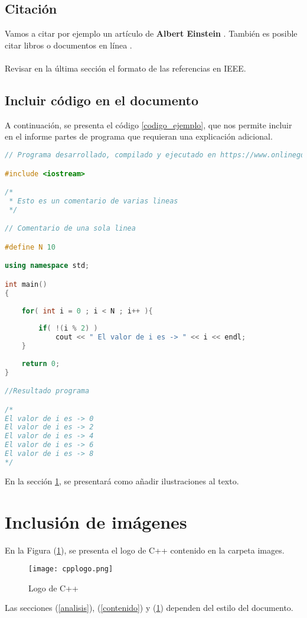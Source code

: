 \documentclass{article}
\begin{document}
\subsection{Citación}
Vamos a citar por ejemplo un artículo de \textbf{Albert Einstein} \cite{einstein}.
También es posible citar libros \cite{dirac} o documentos en línea \cite{knuthwebsite}.\\\\
Revisar en la última sección el formato de las referencias en IEEE.

\subsection{Incluir código en el documento}
%
A continuación, se presenta el código \ref{codigo_ejemplo}, que nos permite incluir en el informe partes de programa que requieran una explicación adicional.
\begin{lstlisting}[language=C++, label=codigo_ejemplo]
// Programa desarrollado, compilado y ejecutado en https://www.onlinegdb.com

#include <iostream>

/*
 * Esto es un comentario de varias lineas
 */

// Comentario de una sola linea

#define N 10

using namespace std;

int main()
{
    
    for( int i = 0 ; i < N ; i++ ){
        
        if( !(i % 2) )
            cout << " El valor de i es -> " << i << endl;
    }
    
    return 0;
}

//Resultado programa

/*
El valor de i es -> 0
El valor de i es -> 2
El valor de i es -> 4
El valor de i es -> 6
El valor de i es -> 8
*/
\end{lstlisting}
En la sección \ref{imagenes}, se presentará como añadir ilustraciones al texto.

\section{Inclusión de imágenes} \label{imagenes}

En la Figura (\ref{fig:cpplogo}), se presenta el logo de C++ contenido en la carpeta images.

\begin{figure}[h]
\texttt{[image: cpplogo.png]}
\centering
\caption{Logo de C++}
\label{fig:cpplogo}
\end{figure}

Las secciones (\ref{analisis}), (\ref{contenido}) y (\ref{imagenes}) dependen del estilo del documento.



\end{document}
